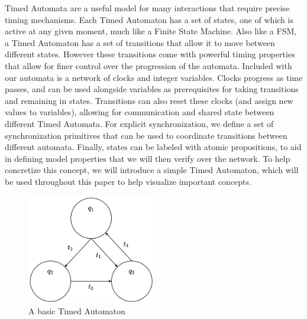 \documentclass[a4paper,11pt]{report}
\theoremstyle{definition}
\begin{document}
Timed Automata are a useful model for many interactions that require precise
timing mechanisms\cite{alur94}. Each Timed Automaton has a set of states, one of
which is active at any given moment, much like a Finite State Machine. Also like
a FSM, a Timed Automaton has a set of transitions that allow it to move between
different states. However these transitions come with powerful timing properties
that allow for finer control over the progression of the automata. Included with
our automata is a network of clocks and integer variables. Clocks progress as
time passes, and can be used alongside variables as prerequisites for taking
transitions and remaining in states. Transitions can also reset these clocks
(and assign new values to variables), allowing for communication and shared
state between different Timed Automata. For explicit synchronization, we define
a set of synchronization primitives that can be used to coordinate transitions
between different automata. Finally, states can be labeled with atomic
propositions, to aid in defining model properties that we will then verify over
the network. To help concretize this concept, we will introduce a simple Timed
Automaton, which will be used throughout this paper to help visualize important
concepts.

%    
\begin{figure}[h]
  \centering
  \includegraphics[width=0.5\textwidth]{minTA-blank}
  \caption{A basic Timed Automaton}
  \label{fig:example-blank}
\end{figure}
\end{document}
